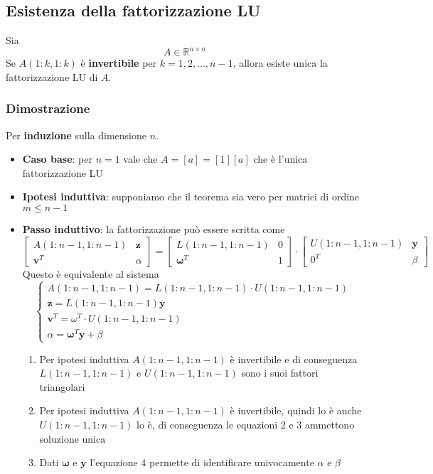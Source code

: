 \newpage
\subsection{Esistenza della fattorizzazione LU}
\begin{theorem}
	Sia
	\begin{equation*}
		A \in \mathbb{R}^{n \times n}
	\end{equation*}
	Se $A(1:k,1:k)$ è \textbf{invertibile} per $k=1,2,\ldots, n-1$, allora esiste unica la fattorizzazione LU di $A$.
\end{theorem}
\subsubsection{Dimostrazione}
Per \textbf{induzione} sulla dimensione $n$.
\begin{itemize}
	\item \textbf{Caso base}: per $n=1$ vale che $A=[a] = [1][a]$ che è l'unica fattorizzazione LU
	\item \textbf{Ipotesi induttiva}: supponiamo che il teorema sia vero per matrici di ordine $m \leq n-1$
	\item \textbf{Passo induttivo}: la fattorizzazione può essere scritta come
	\begin{equation*}
		\begin{bmatrix}
			A(1:n-1, 1:n-1) & \mathbf{z} \\
			\mathbf{v}^T & \alpha
		\end{bmatrix} = \begin{bmatrix}
		L(1:n-1, 1:n-1) & 0 \\
		\mathbf{\omega}^T & 1
		\end{bmatrix} \cdot \begin{bmatrix}
		U(1:n-1, 1:n-1) & \mathbf{y} \\
		0^T & \beta
		\end{bmatrix}
	\end{equation*}
	Questo è equivalente al sistema
	\begin{equation*}
		\begin{cases}
			A(1:n-1,1:n-1) = L(1:n-1,1:n-1) \cdot U(1:n-1, 1:n-1) \\
			\mathbf{z} = L(1:n-1, 1:n-1)\mathbf{y} \\
			\mathbf{v}^T=\omega^T \cdot U(1:n-1, 1:n-1) \\
			\alpha = \mathbf{\omega}^T \mathbf{y} + \beta
		\end{cases}
	\end{equation*}
	\begin{enumerate}
		\item Per ipotesi induttiva $A(1:n-1, 1:n-1)$ è invertibile e di conseguenza $L(1:n-1,1:n-1)$ e $U(1:n-1, 1:n-1)$ sono i suoi fattori triangolari 
		\item  Per ipotesi induttiva $A(1:n-1, 1:n-1)$ è invertibile, quindi lo è anche $U(1:n-1, 1:n-1)$ lo è, di conseguenza le equazioni 2 e 3 ammettono soluzione unica
		\item Dati $\mathbf{\omega}$ e $\mathbf{y}$ l'equazione 4 permette di identificare univocamente $\alpha$ e $\beta$
	\end{enumerate}
\end{itemize}

